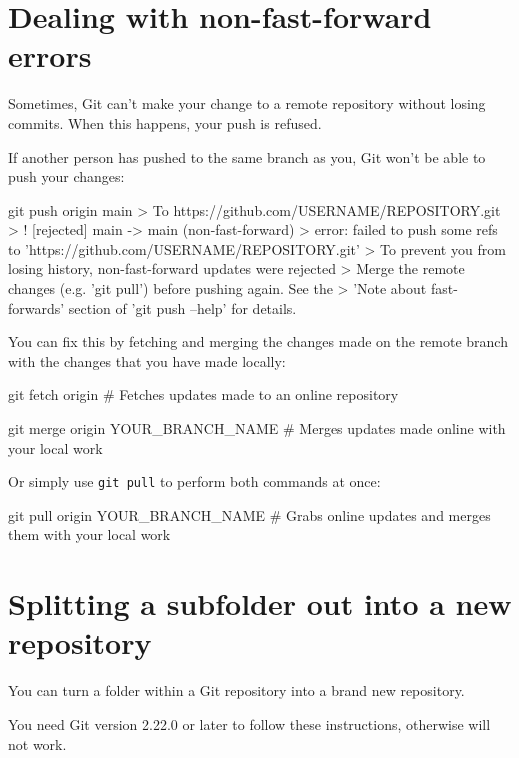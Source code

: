 \newpage
\section{Dealing with non-fast-forward errors}

Sometimes, Git can't make your change to a remote repository without losing commits. When this happens, your push is refused. 

If another person has pushed to the same branch as you, Git won't be able to push your changes:
\begin{exampleblock}
    \begin{codeblock}[language=bash]
git push origin main
> To https://github.com/USERNAME/REPOSITORY.git
>  ! [rejected]        main -> main (non-fast-forward)
> error: failed to push some refs to 'https://github.com/USERNAME/REPOSITORY.git'
> To prevent you from losing history, non-fast-forward updates were rejected
> Merge the remote changes (e.g. 'git pull') before pushing again. See the
> 'Note about fast-forwards' section of 'git push --help' for details.
    \end{codeblock}
\end{exampleblock}

You can fix this by fetching and merging the changes made on the remote branch with the changes that you have made locally:
\begin{codeblock}[language=bash]
git fetch origin 
# Fetches updates made to an online repository

git merge origin YOUR_BRANCH_NAME
# Merges updates made online with your local work
\end{codeblock}

Or simply use \texttt{git pull} to perform both commands at once:
\begin{codeblock}[language=bash]
git pull origin YOUR_BRANCH_NAME 
# Grabs online updates and merges them with your local work 
\end{codeblock}


\section{Splitting a subfolder out into a new repository}

 You can turn a folder within a Git repository into a brand new repository. 
 \begin{warningblock}
 You need Git version 2.22.0 or later to follow these instructions, otherwise  will not work.
 \end{warningblock}

